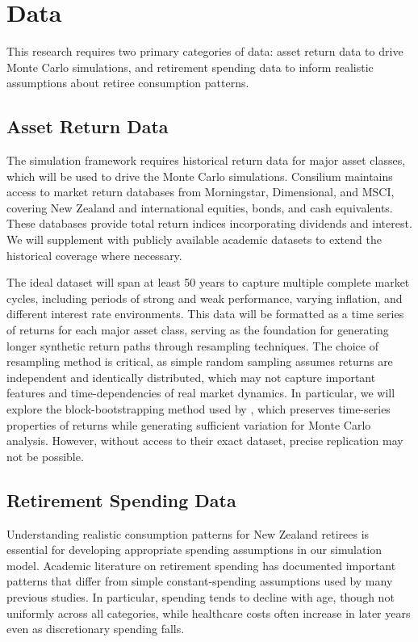 \documentclass[11pt]{article}
\begin{document}
\section{Data}

This research requires two primary categories of data: asset return data to drive Monte Carlo simulations, and retirement spending data to inform realistic assumptions about retiree consumption patterns. 

\subsection{Asset Return Data}

The simulation framework requires historical return data for major asset classes, which will be used to drive the Monte Carlo simulations. Consilium maintains access to market return databases from Morningstar, Dimensional, and MSCI, covering New Zealand and international equities, bonds, and cash equivalents. These databases provide total return indices incorporating dividends and interest. We will supplement with publicly available academic datasets to extend the historical coverage where necessary.

The ideal dataset will span at least 50 years to capture multiple complete market cycles, including periods of strong and weak performance, varying inflation, and different interest rate environments. This data will be formatted as a time series of returns for each major asset class, serving as the foundation for generating longer synthetic return paths through resampling techniques. The choice of resampling method is critical, as simple random sampling assumes returns are independent and identically distributed, which may not capture important features and time-dependencies of real market dynamics. In particular, we will explore the block-bootstrapping method used by \textcite{anarkulova2025beyond}, which preserves time-series properties of returns while generating sufficient variation for Monte Carlo analysis. However, without access to their exact dataset, precise replication may not be possible.

\subsection{Retirement Spending Data}

Understanding realistic consumption patterns for New Zealand retirees is essential for developing appropriate spending assumptions in our simulation model. Academic literature on retirement spending has documented important patterns that differ from simple constant-spending assumptions used by many previous studies. In particular, spending tends to decline with age, though not uniformly across all categories, while healthcare costs often increase in later years even as discretionary spending falls.
\end{document}
